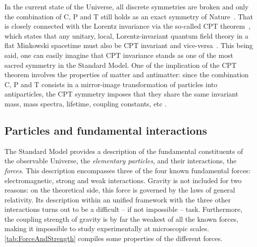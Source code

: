 In the current state of the Universe, all discrete symmetries are broken and only the combination of C, P and T still holds as an exact symmetry of Nature~\cite{sozziTestsDiscreteSymmetries2019}. That is closely connected with the Lorentz invariance via the so-called CPT theorem~\cite{lehnertCPTSymmetryIts2016}, which states that any unitary, local, Lorentz-invariant quantum field theory in a flat Minkowski spacetime must also be CPT invariant and vice-versa~\cite{sachsPhysicsTimeReversal1987, lehnertCPTSymmetryIts2016}. This being said, one can easily imagine that CPT invariance stands as one of the most sacred symmetry in the Standard Model. One of the implication of the CPT theorem involves the properties of matter and antimatter: since the combination C, P and T consists in a mirror-image transformation of particles into antiparticles, the CPT symmetry imposes that they share the same invariant mass, mass spectra, lifetime, coupling constants, etc  \cite{lehnertCPTSymmetryIts2016}.

\subsection{Particles and fundamental interactions}
\label{subsec:ParticleAndInteractions}

The Standard Model provides a description of the fundamental constituents of the observable Universe, the \textit{elementary particles}, and their interactions, the  \textit{forces}. This description encompasses three of the four known fundamental forces: electromagnetic, strong and weak interactions. Gravity is not included for two reasons: on the theoretical side, this force is governed by the laws of general relativity. Its description within an unified framework with the three other interactions turns out to be a difficult -- if not impossible -- task. Furthermore, the coupling strength of gravity is by far the weakest of all the known forces, making it impossible to study experimentally at microscopic scales. \Tab\ref{tab:ForceAndStrength} compiles some properties of the different forces.

